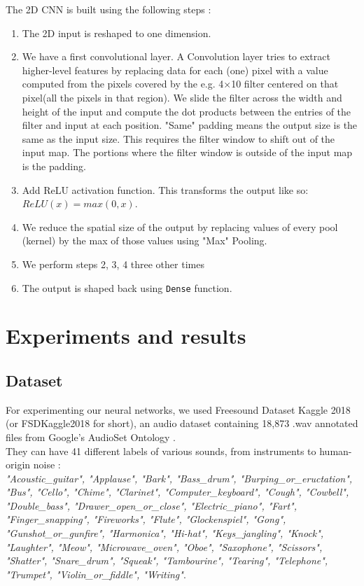 \documentclass{article} %
\begin{document}
		The 2D CNN is built using the following steps :
		\begin{enumerate} 
			\item The 2D input is reshaped to one dimension.
			\item We have a first convolutional layer. A Convolution layer tries to extract higher-level features by replacing data for each (one) pixel with a value computed from the pixels covered by the e.g. 4×10 filter centered on that pixel(all the pixels in that region). We slide the filter across the width and height of the input and compute the dot products between the entries of the filter and input at each position. "Same" padding means the output size is the same as the input size. This requires the filter window to shift out of the input map. The portions where the filter window is outside of the input map is the padding.
			\item Add ReLU activation function. This transforms the output like so: $ReLU(x) = max(0,x)$.
			\item  We reduce the spatial size of the output by replacing values of every pool (kernel) by the max of those values using "Max" Pooling.
			\item We perform steps 2, 3, 4 three other times
			\item The output is shaped back using \verb+Dense+ function. 
		\end{enumerate}

\section{Experiments and results}
	\subsection{Dataset}
		For experimenting our neural networks, we used Freesound Dataset Kaggle 2018 (or FSDKaggle2018 for short), an audio dataset containing 18,873 .wav annotated files from Google's AudioSet Ontology \cite{audioset}.\\
		They can have 41 different labels of various sounds, from instruments to human-origin noise :\\
		\textit{"Acoustic\_guitar", "Applause", "Bark", "Bass\_drum", "Burping\_or\_eructation", "Bus", "Cello", "Chime", "Clarinet", "Computer\_keyboard", "Cough", "Cowbell", "Double\_bass", "Drawer\_open\_or\_close", "Electric\_piano", "Fart", "Finger\_snapping", "Fireworks", "Flute", "Glockenspiel", "Gong", "Gunshot\_or\_gunfire", "Harmonica", "Hi-hat", "Keys\_jangling", "Knock", "Laughter", "Meow", "Microwave\_oven", "Oboe", "Saxophone", "Scissors", "Shatter", "Snare\_drum", "Squeak", "Tambourine", "Tearing", "Telephone", "Trumpet", "Violin\_or\_fiddle", "Writing"}.\\
\end{document}

